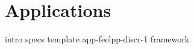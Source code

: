 \chapter{Applications}
\label{chap:applications}

{intro}
{specs}
{template}
{app-feelpp-discr-1}
{framework}

